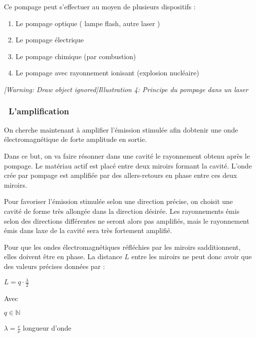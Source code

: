 \documentclass[12pt,twoside]{article}
\newcommand\liststyleLv{%
\renewcommand\labelitemi{[25CF?]}
\renewcommand\labelitemii{[25CB?]}
\renewcommand\labelitemiii{[25A0?]}
\renewcommand\labelitemiv{[25CF?]}
}
\begin{document}
Ce pompage peut s'effectuer au moyen de plusieurs dispositifs :

\liststyleLv
\begin{enumerate}
\item Le pompage optique ( lampe flash, autre laser )
\item Le pompage \'electrique
\item Le pompage chimique (par combustion)
\item Le pompage avec rayonnement ionisant (explosion nucl\'eaire)
\end{enumerate}
{\centering
\begin{minipage}{12.003cm}
{\itshape
[Warning: Draw object ignored]Illustration 4: Principe du pompage dans
un laser}
\end{minipage}
\par}

\subsubsection[\ L'amplification]{\ L'amplification}
On cherche maintenant \`a amplifier l'\'emission stimul\'ee afin
d{\textquotesingle}obtenir une onde \'electromagn\'etique de forte
amplitude en sortie.

Dans ce but, on va faire r\'esonner dans une cavit\'e le rayonnement
obtenu apr\`es le pompage. Le mat\'eriau actif est plac\'e entre deux
miroirs formant la cavit\'e. L'onde cr\'ee par pompage est amplifi\'ee
par des allers{}-retours en phase entre ces deux miroirs.

Pour favoriser l'\'emission stimul\'ee selon une direction pr\'ecise, on
choisit une cavit\'e de forme tr\`es allong\'ee dans la direction
d\'esir\'ee. Les rayonnements \'emis selon des directions diff\'erentes
ne seront alors pas amplifi\'es, mais le rayonnement \'emis dans
l{\textquotesingle}axe de la cavit\'e sera tr\`es fortement amplifi\'e.

Pour que les ondes \'electromagn\'etiques r\'efl\'echies par les miroirs
s{\textquotesingle}additionnent, elles doivent \^etre en phase. La
distance $L$ entre les miroirs ne peut donc avoir que des valeurs
pr\'ecises donn\'ees par :

{\centering
 $L=q\cdot {\frac{\lambda }{2}}$ 
\par}

\MakeUppercase{a}vec

 $q\in \mathbb{N}$ 

 $\lambda =\frac{c}{\nu }$ longueur d'onde
\end{document}
